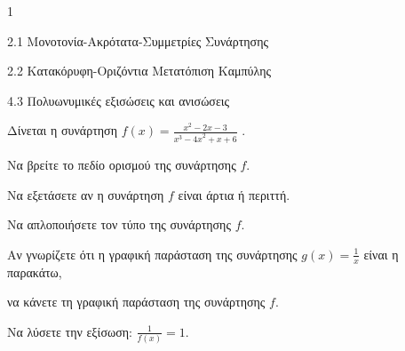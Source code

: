 \begin{ylh}{1}
\item 2.1 Μονοτονία-Ακρότατα-Συμμετρίες Συνάρτησης
\item 2.2 Κατακόρυφη-Οριζόντια Μετατόπιση Καμπύλης
\item 4.3 Πολυωνυμικές εξισώσεις και ανισώσεις
\end{ylh}
Δίνεται η συνάρτηση $f(x) = \frac{x^{2} - 2x - 3}{{x^{3} - 4x}^{2} + x + 6}$ .
\begin{alist}
\item Να βρείτε το πεδίο ορισμού της συνάρτησης $f$.
\item Να εξετάσετε αν η συνάρτηση $f$ είναι άρτια ή περιττή.
\item
\end{alist}
\begin{alist}
\item
  Να απλοποιήσετε τον τύπο της συνάρτησης $f$.
\end{alist}
\begin{alist}
\item
  Αν γνωρίζετε ότι η γραφική παράσταση της συνάρτησης $g(x) = \frac{1}{x}$ είναι η παρακάτω,
\begin{center}
\end{center}
να κάνετε τη γραφική παράσταση της συνάρτησης $f$.
\item Να λύσετε την εξίσωση: $\frac{1}{f(x)} = 1$.
\end{alist}

